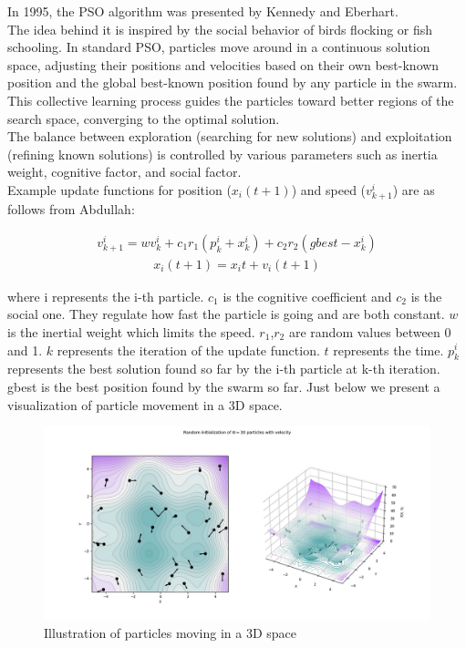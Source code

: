 \documentclass{Configuration_Files/PoliMi3i_thesis}
\begin{document}
In 1995, the PSO algorithm was presented by Kennedy and Eberhart. \cite{okwuMetaheuristicOptimizationNatureInspired2020} \\
The idea behind it is inspired by the social behavior of birds flocking or fish schooling. \cite{vanneschiParticleSwarmOptimization2023}
In standard PSO, particles move around in a continuous solution space, adjusting their positions and velocities based on their own best-known position and the global best-known position found by any particle in the swarm.
\\
This collective learning process guides the particles toward better regions of the search space, converging to the optimal solution. \\
The balance between exploration (searching for new solutions) and exploitation (refining known solutions) is controlled by various parameters such as inertia weight, cognitive factor, and social factor. \\
Example update functions for position ($x_{i}(t+1)$) and speed ($v^{i}_{k+1}$) are as follows from Abdullah\cite{abdullahEEGChannelSelection2022}:

\begin{align}
	v_{k+1}^i=w v_k^i+c_1 r_1\left(p_k^i+x_k^i\right)+c_2 r_2\left(g b e s t-x_k^i\right)
	\label{eq:bpso1}
\end{align}
\begin{align}
	x_i(t+1)=x_i t+v_i(t+1)
	\label{eq:bpso2}
\end{align}

where i represents the i-th particle. $c_1$ is the cognitive coefficient and $c_2$ is the social one. They regulate how fast the particle is going and are both constant. $w$ is the inertial weight which limits the speed. $r_1$,$r_2$ are random values between 0 and 1. $k$ represents the iteration of the update function. $t$ represents the time. $p^{i}_{k}$ represents the best solution found so far by the i-th particle at k-th iteration. gbest is the best position found by the swarm so far.
Just below we present a visualization of particle movement in a 3D space. 

\begin{figure}[H]
	\includegraphics[scale=0.35]{pso.png}
	\caption{Illustration of particles moving in a 3D space}
\end{figure}
\end{document}
